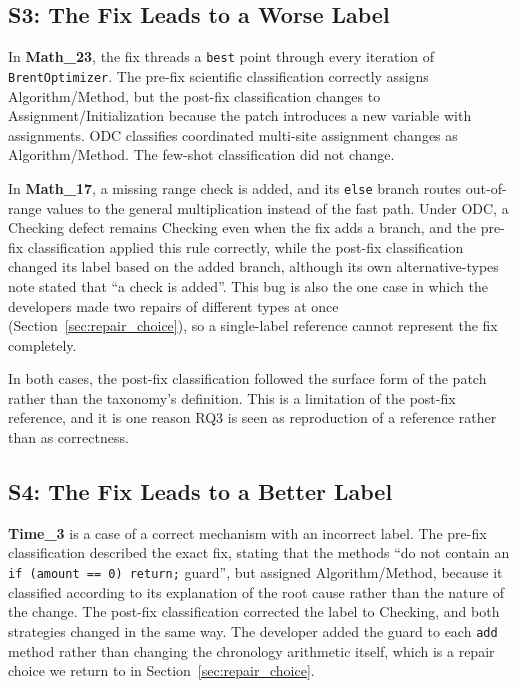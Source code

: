 \documentclass{iutbscthesis}
\begin{document}
\subsection{S3: The Fix Leads to a Worse Label}

In \textbf{Math\_23}, the fix threads a \texttt{best} point through every iteration of \texttt{Brent\allowbreak Optimizer}. The pre-fix scientific classification correctly assigns Algorithm/Method, but the post-fix classification changes to Assignment/\allowbreak Initialization because the patch introduces a new variable with assignments. ODC classifies coordinated multi-site assignment changes as Algorithm/Method. The few-shot classification did not change.

In \textbf{Math\_17}, a missing range check is added, and its \texttt{else} branch routes out-of-range values to the general multiplication instead of the fast path. Under ODC, a Checking defect remains Checking even when the fix adds a branch, and the pre-fix classification applied this rule correctly, while the post-fix classification changed its label based on the added branch, although its own alternative-types note stated that ``a check is added''. This bug is also the one case in which the developers made two repairs of different types at once (Section~\ref{sec:repair_choice}), so a single-label reference cannot represent the fix completely.

In both cases, the post-fix classification followed the surface form of the patch rather than the taxonomy's definition. This is a limitation of the post-fix reference, and it is one reason RQ3 is seen as reproduction of a reference rather than as correctness.

\subsection{S4: The Fix Leads to a Better Label}

\textbf{Time\_3} is a case of a correct mechanism with an incorrect label. The pre-fix classification described the exact fix, stating that the methods ``do not contain an \texttt{if (amount == 0) return;} guard'', but assigned Algorithm/Method, because it classified according to its explanation of the root cause rather than the nature of the change. The post-fix classification corrected the label to Checking, and both strategies changed in the same way. The developer added the guard to each \texttt{add} method rather than changing the chronology arithmetic itself, which is a repair choice we return to in Section~\ref{sec:repair_choice}.
\end{document}
